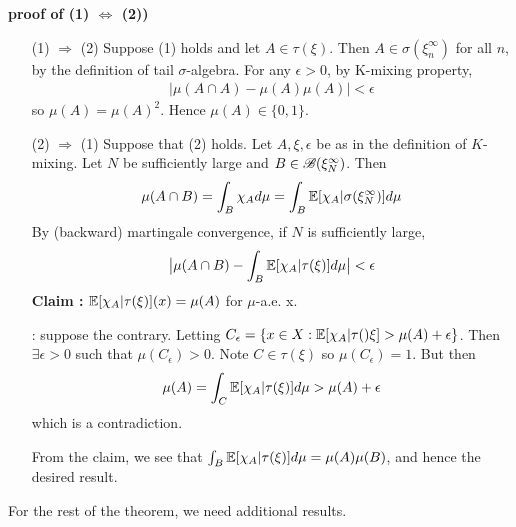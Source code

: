 \documentclass[12pt,a4paper]{report}
\newenvironment{proof}
{\begin{changemargin}{1cm}{0.5cm} 
	}%
	{\end{changemargin}
}
\newenvironment{subproof}
{\begin{changemargin}{0.5cm}{0.5cm}
	}%
	{\end{changemargin}
}
\begin{document}
\begin{proof}
\textbf{proof of (1) $\Leftrightarrow$ (2))} \begin{itemize}
\item[(1) $\Rightarrow$ (2)] Suppose (1) holds and let $A\in \tau(\xi)$. Then $A \in \sigma(\xi^{\infty}_n)$ for all $n$, by the definition of tail $\sigma$-algebra. For any $\epsilon >0$, by K-mixing property,
\begin{align*}
| \mu(A \cap A) - \mu(A) \mu(A)| < \epsilon
\end{align*}
so $\mu(A) = \mu(A)^2$. Hence $\mu(A) \in \{0,1\}$.
\item[(2) $\Rightarrow$ (1)] Suppose that (2) holds. Let $A, \xi, \epsilon$ be as in the definition of $K$-mixing. Let $N$ be sufficiently large and $B\in \mathscr{B}(\xi_N^{\infty})$. Then
\begin{align*}
\mu(A \cap B) = \int_B \chi_A d\mu = \int_B \mathbb{E}[ \chi_A | \sigma(\xi_N^{\infty})]  d\mu
\end{align*}
By (backward) martingale convergence, if $N$ is sufficiently large,
\begin{align*}
\big| \mu(A \cap B) - \int_B \mathbb{E}[\chi_A | \tau (\xi)] d\mu \big| < \epsilon
\end{align*}
\textbf{Claim :} $\mathbb{E}[\chi_A | \tau(\xi)] (x) = \mu(A)$ for $\mu$-a.e. x.
\begin{subproof}
: suppose the contrary. Letting $C_{\epsilon} = \{ x\in X : \mathbb{E}[\chi_A | \tau()\xi] > \mu(A) + \epsilon  \}$. Then $\exists \epsilon >0$ such that $\mu(C_{\epsilon}) >0$. Note $C \in \tau(\xi)$ so $\mu(C_{\epsilon})=1$. But then
\begin{align*}
\mu(A) =\int_C \mathbb{E}[ \chi_A | \tau(\xi)] d\mu > \mu(A) + \epsilon
\end{align*}
which is a contradiction.
\end{subproof}
From the claim, we see that $\int_B \mathbb{E}[\chi_A |\tau(\xi)] d\mu = \mu(A) \mu(B)$, and hence the desired result.
\end{itemize}
\end{proof}
\s

For the rest of the theorem, we need additional results.
\s
\end{document}
